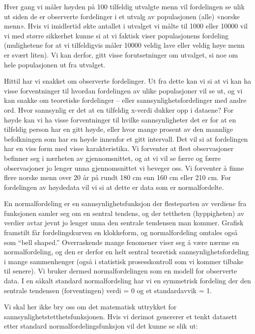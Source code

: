 \documentclass[
]{book}
\begin{document}
Hver gang vi måler høyden på 100 tilfeldig utvalgte menn vil fordelingen se ulik ut siden de er observerte fordelinger i et utvalg av populasjonen (alle) «norske menn». Hvis vi imidlertid økte antallet i utvalget vi målte til 1000 eller 10000 vil vi med større sikkerhet kunne si at vi faktisk viser populasjonens fordeling (mulighetene for at vi tilfeldigvis måler 10000 veldig lave eller veldig høye menn er svært liten). Vi kan derfor, gitt visse forutsetninger om utvalget, si noe om hele populasjonen ut fra utvalget.

Hittil har vi snakket om observerte fordelinger. Ut fra dette kan vi si at vi kan ha visse forventninger til hvordan fordelingen av ulike populasjoner vil se ut, og vi kan snakke om teoretiske fordelinger -- eller sannsynlighetsfordelinger med andre ord. Hvor sannsynlig er det at en tilfeldig x-verdi dukker opp i dataene? For høyde kan vi ha visse forventninger til hvilke sannsynligheter det er for at en tilfeldig person har en gitt høyde, eller hvor mange prosent av den mannlige befolkningen som har en høyde innenfor et gitt intervall. Det vil si at fordelingen har en viss form med visse karakteristika. Vi forventer at flest observasjoner befinner seg i nærheten av gjennomsnittet, og at vi vil se færre og færre observasjoner jo lenger unna gjennomsnittet vi beveger oss. Vi forventer å finne flere norske menn over 20 år på rundt 180 cm enn 160 cm eller 210 cm. For fordelingen av høydedata vil vi si at dette er data som er normalfordelte.

En normalfordeling er en sannsynlighetsfunksjon der flesteparten av verdiene fra funksjonen samler seg om en sentral tendens, og der tettheten (hyppigheten) av verdier avtar jevnt jo lenger unna den sentrale tendensen man kommer. Grafisk framstilt får fordelingskurven en klokkeform, og normalfordeling omtales også som ``bell shaped.'' Overraskende mange fenomener viser seg å være nærme en normalfordeling, og den er derfor en helt sentral teoretisk sannsynlighetsfordeling i mange sammenhenger (også i statistisk prosesskontroll som vi kommer tilbake til senere). Vi bruker dermed normalfordelingen som en modell for observerte data. I en såkalt standard normalfordeling har vi en symmetrisk fordeling der den sentrale tendensen (forventingen) verdi = 0 og et standardavvik = 1.

Vi skal her ikke bry oss om det matematisk uttrykket for sannsynlighetstetthetsfunksjonen. Hvis vi derimot genererer et tenkt datasett etter standard normalfordelingsfunksjon vil det kunne se slik ut:
\end{document}

